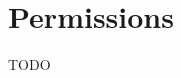 \documentclass[FIPLY_base.tex]{subfiles}
\author{Andreas Denkmayr}
\date{25. Februar 2016}
\begin{document}
\section{Permissions}
TODO
\end{document}
